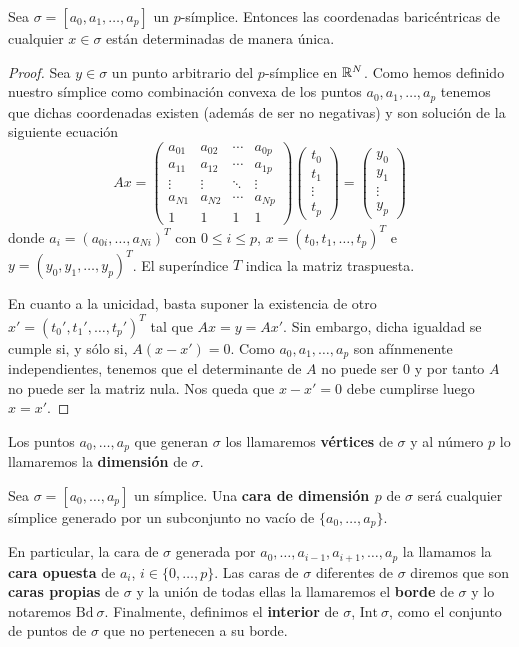 \begin{proposicion}
	Sea $\sigma=[a_0,a_1,\dots,a_p]$ un $p$-símplice. Entonces las coordenadas baricéntricas de cualquier $x \in \sigma$ están determinadas de manera única.
\end{proposicion}
\begin{proof}
	Sea $y \in \sigma$ un punto arbitrario del $p$-símplice en $\mathbb{R}^N$. Como hemos definido nuestro símplice como combinación convexa de los puntos $a_0, a_1, \dots, a_p$ tenemos que dichas coordenadas existen (además de ser no negativas) y son solución de la siguiente ecuación
	\[
	Ax = \begin{pmatrix}
		a_{01} & a_{02} & \cdots  & a_{0p} \\
		a_{11} & a_{12} & \cdots & a_{1p} \\
		 \vdots & \vdots & \ddots & \vdots \\
		a_{N1} & a_{N2} & \cdots & a_{Np}  \\
		1 & 1 & 1 & 1 
	\end{pmatrix}
	\begin{pmatrix}
		t_0 \\
		t_1 \\
		\vdots \\
		t_p
	\end{pmatrix}
	= 
	\begin{pmatrix}
		y_0 \\
		y_1 \\
		\vdots \\
		y_p
	\end{pmatrix}
	\]
	donde $a_i = (a_{0i}, \dots, a_{Ni})^T$ con $0 \leq i \leq p$, $x = (t_0,t_1,\dots,t_p)^T$ e $y = (y_0,y_1,\dots,y_p)^T$. El superíndice $T$ indica la matriz traspuesta. 
	
	En cuanto a la unicidad, basta suponer la existencia de otro $x'=(t_0',t_1', \dots, t_p')^T$ tal que $Ax = y = Ax'$. Sin embargo, dicha igualdad se cumple si, y sólo si, $A(x-x')=0$. Como $a_0,a_1,\dots,a_p$ son afínmenente independientes, tenemos que el determinante de $A$ no puede ser $0$ y por tanto $A$ no puede ser la matriz nula. Nos queda que $x-x'=0$ debe cumplirse luego $x=x'$.
\end{proof}

Los puntos $a_0, \dots, a_p$ que generan $\sigma$ los llamaremos \textbf{vértices} de $\sigma$
y al número $p$ lo llamaremos la \textbf{dimensión} de $\sigma$.

\begin{definicion}
	Sea $\sigma=[a_0, \dots, a_p]$ un símplice. Una \textbf{cara de dimensión $p$} de $\sigma$ será cualquier
	símplice generado por un subconjunto no vacío de $\{a_0, \dots, a_p\}$.
\end{definicion}
En particular, la cara de $\sigma$ generada por $a_0, \dots, a_{i-1}, a_{i+1}, \dots, a_p$ la 
llamamos la \textbf{cara opuesta} de $a_i$, $i \in \{0, \dots, p\}$. Las caras de $\sigma$ 
diferentes de $\sigma$ diremos que son \textbf{caras propias} de $\sigma$ y la unión de todas ellas la 
llamaremos el \textbf{borde} de $\sigma$ y lo notaremos $\text{Bd}\ \sigma$. Finalmente, definimos el \textbf{interior} de $\sigma$, $\text{Int}\ \sigma$, como el conjunto de puntos de $\sigma$ que no pertenecen 
a su borde.

